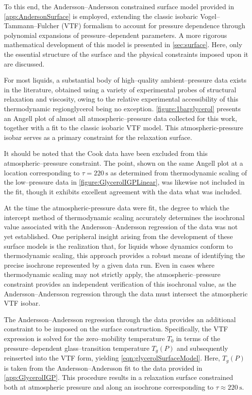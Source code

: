 	To this end, the Andersson--Andersson constrained surface model provided in \app \ref{app:AndersonSurface} is employed, extending the classic isobaric Vogel--Tammann--Fulcher (VTF) formalism to account for pressure dependence through polynomial expansions of pressure--dependent parameters. A more rigorous mathematical development of this model is presented in \sect \ref{sec:surface}.  Here, only the essential structure of the surface and the physical constraints imposed upon it are discussed.
	
	For most liquids, a substantial body of high--quality ambient--pressure data exists in the literature, obtained using a variety of experimental probes of structural relaxation and viscosity, owing to the relative experimental accessibility of this thermodynamic region\textemdash glycerol being no exception. \fig \ref{figure:1barglycerol} presents an Angell plot of almost all atmospheric--pressure data collected for this work, together with a fit to the classic isobaric VTF model. This atmospheric-pressure isobar serves as a primary constraint for the relaxation surface.
	
	It should be noted that the Cook \etal data have been excluded from this atmospheric--pressure constraint. The \tgp point, shown on the same Angell plot at a location corresponding to $\tau = 220~\si{\second}$ as determined from thermodynamic scaling of the low--pressure \tgp data in \fig \ref{figure:GlycerolIGPLinear}, was likewise not included in the fit, though it exhibits excellent agreement with the data what was included. 
	
	At the time the atmospheric-pressure data were fit, the degree to which the intercept method of thermodynamic scaling accurately determines the isochronal value associated with the Andersson--Andersson regression of the \tgp data was not yet established.  One peripheral insight arising from the development of these surface models is the realization that, for liquids whose dynamics conform to thermodynamic scaling, this approach provides a robust means of identifying the precise isochrone represented by a given \tgp data run. Even in cases where thermodynamic scaling may not strictly apply, the atmospheric--pressure constraint provides an independent verification of this isochronal value, as the Andersson--Andersson regression through the \tgp data must intersect the atmospheric VTF isobar.
	
	The Andersson--Andersson regression through the \tgp data provides an additional constraint to be imposed on the surface construction. Specifically, the VTF expression is solved for the zero--mobility temperature $T_0$ in terms of the pressure--dependent glass--transition temperature $T_g(P)$ and subsequently reinserted into the VTF form, yielding  \eqn \ref{eqn:glycerolSurfaceModel}.  Here, $T_g(P)$ is taken from the Andersson--Andersson fit to the \tgp data provided in \app \ref{app:GlycerolIGP}.  
	This procedure results in a relaxation surface constrained both at atmospheric pressure and along an isochrone corresponding to $\tau \approx 220~\si{\second}$.
	
